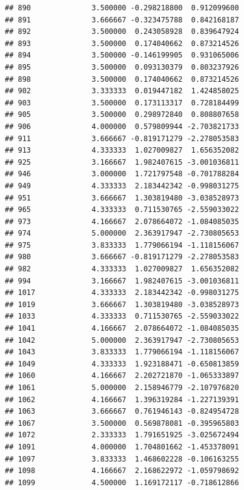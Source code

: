 \documentclass[
]{article}
\begin{document}
\begin{verbatim}
## 890              3.500000 -0.298218800  0.912099600
## 891              3.666667 -0.323475788  0.842168187
## 892              3.500000  0.243058928  0.839647924
## 893              3.500000  0.174040662  0.873214526
## 894              3.500000 -0.146199905  0.931065006
## 895              3.500000  0.093130379  0.803237926
## 898              3.500000  0.174040662  0.873214526
## 902              3.333333  0.019447182  1.424858025
## 903              3.500000  0.173113317  0.728184499
## 905              3.500000  0.298972840  0.808807658
## 906              4.000000  0.579809944 -2.703821733
## 911              3.666667 -0.819171279 -2.278053583
## 913              4.333333  1.027009827  1.656352082
## 925              3.166667  1.982407615 -3.001036811
## 946              3.000000  1.721797548 -0.701788284
## 949              4.333333  2.183442342 -0.998031275
## 951              3.666667  1.303819480 -3.038528973
## 965              4.333333  0.711530765 -2.559033022
## 973              4.166667  2.078664072 -1.084085035
## 974              5.000000  2.363917947 -2.730805653
## 975              3.833333  1.779066194 -1.118156067
## 980              3.666667 -0.819171279 -2.278053583
## 982              4.333333  1.027009827  1.656352082
## 994              3.166667  1.982407615 -3.001036811
## 1017             4.333333  2.183442342 -0.998031275
## 1019             3.666667  1.303819480 -3.038528973
## 1033             4.333333  0.711530765 -2.559033022
## 1041             4.166667  2.078664072 -1.084085035
## 1042             5.000000  2.363917947 -2.730805653
## 1043             3.833333  1.779066194 -1.118156067
## 1049             4.333333  1.923188471 -0.650813859
## 1060             4.166667  2.202721870 -1.065333897
## 1061             5.000000  2.158946779 -2.107976820
## 1062             4.166667  1.396319284 -1.227139391
## 1063             3.666667  0.761946143 -0.824954728
## 1067             3.500000  0.569878081 -0.395965803
## 1072             2.333333  1.791651925 -3.025672494
## 1091             4.000000  1.704801662 -1.453378091
## 1097             3.833333  1.468602228 -0.106163255
## 1098             4.166667  2.168622972 -1.059798692
## 1099             4.500000  1.169172117 -0.718612866
\end{verbatim}
\end{document}
